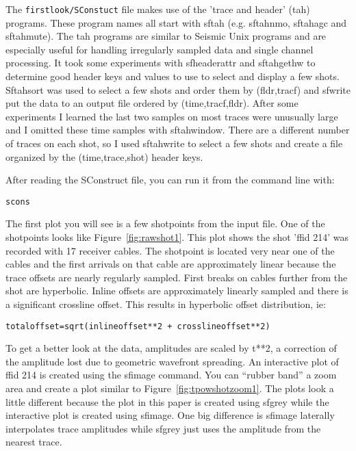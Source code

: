 The \texttt{firstlook/SConstuct} file makes use of the 'trace and header' (tah) programs.  These program names all start with sftah (e.g. sftahnmo, sftahagc and sftahmute).  The tah programs are similar to Seismic Unix programs and are especially useful for handling irregularly sampled data and single channel processing.   It took some experiments with sfheaderattr and sftahgethw to determine good header keys and values to use to select and display a few shots.  Sftahsort was used to select a few shots and order them by (fldr,tracf) and sfwrite put the data to an output file ordered by (time,tracf,fldr).  After some experiments I learned the last two samples on most traces were unusually large and I omitted these time samples with sftahwindow.   There are a different number of traces on each shot, so I used sftahwrite to select a few shots and create a file organized by the (time,trace,shot) header keys. 

After reading the SConstruct file, you can run it from the command line with:
\begin{verbatim}   
scons
\end{verbatim}   

The first plot you will see is a few shotpoints from the input file.  One of the shotpoints looks like Figure~\ref{fig:rawshot1}.  This plot shows the shot 'ffid 214' was recorded with 17 receiver cables.  The shotpoint is located very near one of the cables and the first arrivals on that cable are approximately linear because the trace offsets are nearly regularly sampled.  First breaks on cables further from the shot are hyperbolic.   Inline offsets are approximately linearly sampled and there is a significant crossline offset.  This results in hyperbolic offset distribution, ie:
\begin{verbatim}   
totaloffset=sqrt(inlineoffset**2 + crosslineoffset**2) 
\end{verbatim}   

To get a better look at the data, amplitudes are scaled by t**2, a correction of the amplitude lost due to geometric wavefront spreading.  An interactive plot of ffid 214 is created using the sfimage command.  You can “rubber band” a zoom area and create a plot similar to Figure~\ref{fig:tpowshotzoom1}.   The plots look a little different because the plot in this paper is created using sfgrey while the interactive plot is created using sfimage.  One big difference is sfimage laterally interpolates trace amplitudes while sfgrey just uses the amplitude from the nearest trace.


